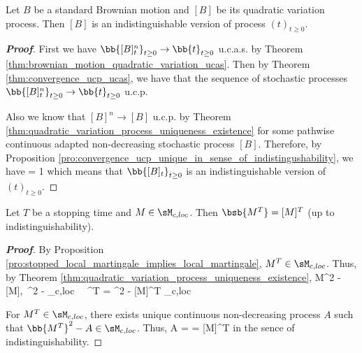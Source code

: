\begin{corollary}
Let $B$ be a standard Brownian motion and $[B]$ be its quadratic variation process. Then $[B]$ is an indistinguishable version of process $(t)_{t\geq 0}$.
\end{corollary}

\begin{proof}[\bf Proof]
First we have $\bb{[B]^n_t}_{t\geq 0} \to \bb{t}_{t\geq 0}$ u.c.a.s. by Theorem \ref{thm:brownian_motion_quadratic_variation_ucas}. Then by Theorem \ref{thm:convergence_ucp_ucas}, we have that the sequence of stochastic processes $\bb{[B]^n_t}_{t\geq 0} \to \bb{t}_{t\geq 0}$ u.c.p.

Also we know that $[B]^n \to [B]$ u.c.p. by Theorem \ref{thm:quadratic_variation_process_uniqueness_existence} for some pathwise continuous adapted non-decreasing stochastic process $[B]$. Therefore, by Proposition \ref{pro:convergence_ucp_unique_in_sense_of_indistingushability}, we have
\be
\pro{} = 1
\ee
which means that $\bb{[B]_t}_{t\geq 0}$ is an indistinguishable version of $(t)_{t\geq 0}$.
\end{proof}



\begin{proposition}\label{pro:local_martingale_quadratic_variation_stoppting_time_in_out}
Let $T$ be a stopping time and $M \in \sM_{c,loc}$. Then $\bsb{M^T} = [M]^T$ (up to indistinguishability).
\end{proposition}

\begin{proof}[\bf Proof]
By Proposition \ref{pro:stopped_local_martingale_implies_local_martingale}, $M^T \in \sM_{c,loc}$. Thus, by Theorem \ref{thm:quadratic_variation_process_uniqueness_existence},
\be
M^2 - [M],\  ^2 -  \in \sM_{c,loc} \ \ra \ ^T = ^2 - [M]^T \in \sM_{c,loc}
\ee

For $M^T\in \sM_{c,loc}$, there exists unique continuous non-decreasing process $A$ such that $\bb{M^T}^2 - A \in \sM_{c,loc}$. Thus,
\be
A =  = [M]^T
\ee
in the sence of indistinguishability.%
\end{proof}

